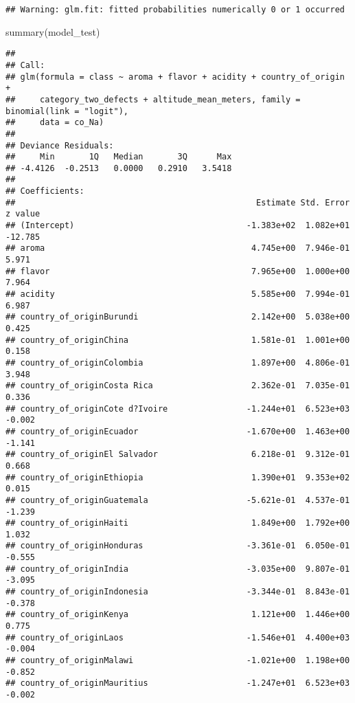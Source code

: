 \documentclass[
]{article}
\newenvironment{Shaded}{\begin{snugshade}}{\end{snugshade}}
\newcommand{\FunctionTok}[1]{\textcolor[rgb]{0.00,0.00,0.00}{#1}}
\newcommand{\NormalTok}[1]{#1}
\begin{document}
\begin{verbatim}
## Warning: glm.fit: fitted probabilities numerically 0 or 1 occurred
\end{verbatim}

\begin{Shaded}
\begin{Highlighting}[]
\FunctionTok{summary}\NormalTok{(model\_test)}
\end{Highlighting}
\end{Shaded}

\begin{verbatim}
## 
## Call:
## glm(formula = class ~ aroma + flavor + acidity + country_of_origin + 
##     category_two_defects + altitude_mean_meters, family = binomial(link = "logit"), 
##     data = co_Na)
## 
## Deviance Residuals: 
##     Min       1Q   Median       3Q      Max  
## -4.4126  -0.2513   0.0000   0.2910   3.5418  
## 
## Coefficients:
##                                                 Estimate Std. Error z value
## (Intercept)                                   -1.383e+02  1.082e+01 -12.785
## aroma                                          4.745e+00  7.946e-01   5.971
## flavor                                         7.965e+00  1.000e+00   7.964
## acidity                                        5.585e+00  7.994e-01   6.987
## country_of_originBurundi                       2.142e+00  5.038e+00   0.425
## country_of_originChina                         1.581e-01  1.001e+00   0.158
## country_of_originColombia                      1.897e+00  4.806e-01   3.948
## country_of_originCosta Rica                    2.362e-01  7.035e-01   0.336
## country_of_originCote d?Ivoire                -1.244e+01  6.523e+03  -0.002
## country_of_originEcuador                      -1.670e+00  1.463e+00  -1.141
## country_of_originEl Salvador                   6.218e-01  9.312e-01   0.668
## country_of_originEthiopia                      1.390e+01  9.353e+02   0.015
## country_of_originGuatemala                    -5.621e-01  4.537e-01  -1.239
## country_of_originHaiti                         1.849e+00  1.792e+00   1.032
## country_of_originHonduras                     -3.361e-01  6.050e-01  -0.555
## country_of_originIndia                        -3.035e+00  9.807e-01  -3.095
## country_of_originIndonesia                    -3.344e-01  8.843e-01  -0.378
## country_of_originKenya                         1.121e+00  1.446e+00   0.775
## country_of_originLaos                         -1.546e+01  4.400e+03  -0.004
## country_of_originMalawi                       -1.021e+00  1.198e+00  -0.852
## country_of_originMauritius                    -1.247e+01  6.523e+03  -0.002

\end{verbatim}
\end{document}
